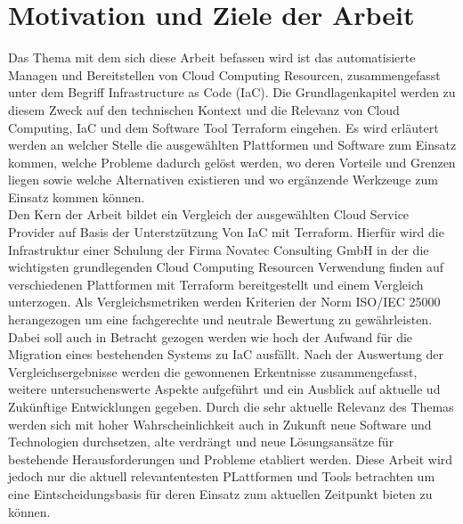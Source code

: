 \section{Motivation und Ziele der Arbeit}
Das Thema mit dem sich diese Arbeit befassen wird ist das automatisierte
Managen und Bereitstellen von Cloud Computing Resourcen,
zusammengefasst unter dem Begriff Infrastructure as Code (IaC). Die Grundlagenkapitel werden zu diesem Zweck auf
den technischen Kontext und die Relevanz von Cloud Computing, IaC und
dem Software Tool Terraform eingehen.
Es wird erläutert werden an welcher Stelle die ausgewählten Plattformen
und Software zum Einsatz kommen, welche Probleme dadurch gelöst werden,
wo deren Vorteile und Grenzen liegen sowie welche Alternativen existieren
und wo ergänzende Werkzeuge zum Einsatz kommen können.\\
Den Kern der Arbeit bildet ein Vergleich der ausgewählten Cloud
Service Provider auf Basis der Unterstzützung Von IaC mit Terraform.
Hierfür wird die Infrastruktur einer Schulung der Firma Novatec
Consulting GmbH in der die wichtigsten grundlegenden Cloud Computing
Resourcen Verwendung finden auf verschiedenen Plattformen mit Terraform
bereitgestellt und einem Vergleich unterzogen.
Als Vergleichsmetriken werden Kriterien der Norm ISO/IEC 25000
herangezogen um eine fachgerechte und neutrale Bewertung zu gewährleisten.
Dabei soll auch in Betracht gezogen werden wie hoch der Aufwand für die
Migration eines bestehenden Systems zu IaC ausfällt.
Nach der Auswertung der Vergleichsergebnisse werden die gewonnenen
Erkentnisse zusammengefasst, weitere untersuchenswerte Aspekte aufgeführt
und ein Ausblick auf aktuelle ud Zukünftige Entwicklungen gegeben. Durch
die sehr aktuelle Relevanz des Themas werden sich mit hoher
Wahrscheinlichkeit auch
in Zukunft neue Software und Technologien durchsetzen, alte verdrängt und
neue Lösungsansätze für bestehende Herausforderungen und Probleme
etabliert werden. Diese Arbeit wird jedoch nur die aktuell relevantentesten
PLattformen und Tools betrachten um eine Eintscheidungsbasis für deren
Einsatz zum aktuellen Zeitpunkt bieten zu können.
